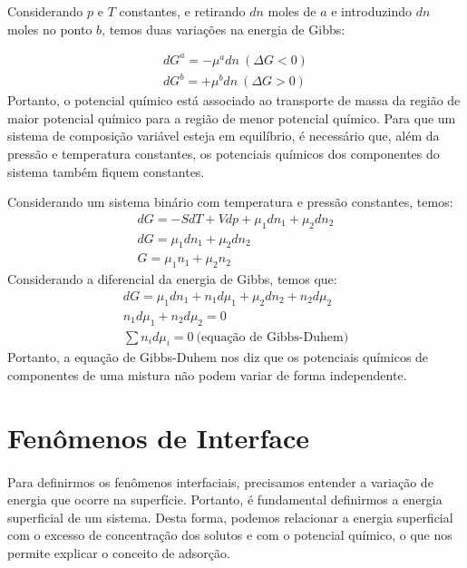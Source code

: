   Considerando $p$ e $T$ constantes, e retirando $dn$ moles de $a$ e introduzindo $dn$ moles no ponto $b$, temos duas variações na energia de Gibbs:
  \begin{theorem}
    \begin{gather}
      dG^a = - \mu^a dn \ (\Delta G < 0) \\
      dG^b = + \mu^b dn \ (\Delta G > 0)
    \end{gather}
    Portanto, o potencial químico está associado ao transporte de massa da região de maior potencial químico para a região de menor potencial químico.
    Para que um sistema de composição variável esteja em equilíbrio, é necessário que, além da pressão e temperatura constantes, os potenciais químicos dos componentes do sistema também fiquem constantes.
  \end{theorem}

  \begin{definition}
    Considerando um sistema binário com temperatura e pressão constantes, temos:
    \begin{gather}
      dG = -SdT + Vdp + \mu_1 dn_1 + \mu_2 dn_2 \\
      dG = \mu_1 dn_1 + \mu_2 dn_2 \\
      G = \mu_1 n_1 + \mu_2 n_2
    \end{gather}
    Considerando a diferencial da energia de Gibbs, temos que:
    \begin{gather}
      dG = \mu_1 dn_1 + n_1 d\mu_1 + \mu_2 dn_2 + n_2 d\mu_2 \\
      n_1 d\mu_1 + n_2 d\mu_2 = 0 \\
      \sum n_i d\mu_i = 0 \ \text{(equação de Gibbs-Duhem)}
    \end{gather}
    Portanto, a equação de Gibbs-Duhem nos diz que os potenciais químicos de componentes de uma mistura não podem variar de forma independente.
  \end{definition}

  \section*{Fenômenos de Interface}

  \paragraph{ } Para definirmos os fenômenos interfaciais, precisamos entender a variação de energia que ocorre na superfície. Portanto, é fundamental definirmos a energia superficial de um sistema. Desta forma, podemos relacionar a energia superficial com o excesso de concentração dos solutos e com o potencial químico, o que nos permite explicar o conceito de adsorção.

